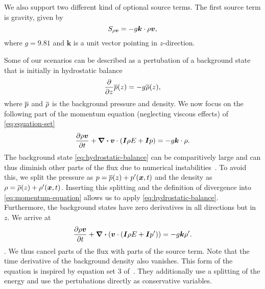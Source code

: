 We also support two different kind of optional source terms.
The first source term is gravity, given by
\begin{equation}\label{eq:source-gravity}
  \source[\Qj] = - g \bm{k} \cdot \Qj,
\end{equation}
where $g = 9.81$ and $\bm{k}$ is a unit vector pointing in $z$-direction.

\newcommand{\backgroundPressure}{\overline{\pressure}}
\newcommand{\backgroundRho}{\overline{\Qrho}}
Some of our scenarios can be described as a pertubation of a background state that is initially in hydrostatic balance
\begin{equation}
  \label{eq:hydrostatic-balance}
  \pdv{}{z} \backgroundPressure{\left (z \right )} = -g \backgroundRho(z),
\end{equation}
where $\backgroundPressure$ and $\backgroundRho$ is the background pressure and density.
We now focus on the following part of the momentum equation (neglecting viscous effects) of \cref{eq:equation-set}
\begin{equation}
  \label{eq:momentum-equation}
  \pdv{\Qj}{t}+ \divergence{
    \Qv \cdot \left( \bm{I} \QE + \bm{I} \pressure \right)
  }
  =
  -g \bm{k} \cdot \Qrho.
\end{equation}
The background state \cref{eq:hydrostatic-balance} can be comparitively large and can thus diminish other parts of the flux due to numerical instabilities~\cite{muller2010adaptive}.
To avoid this, we split the pressure as $\pressure = \backgroundPressure(z) + \pressure' (\bm{x}, t)$ and the density as $\Qrho = \backgroundRho(z) + \Qrho'(\bm{x}, t)$.
Inserting this splitting and the definition of divergence into \cref{eq:momentum-equation} allows us to apply \cref{eq:hydrostatic-balance}.
Furthermore, the background states have zero derivatives in all directions but in $z$.
We arrive at 
\begin{equation}
  \label{eq:momentum-equation-split}
  \pdv{\Qj}{t}+ \divergence \left(
    \Qv \cdot \left( \bm{I} \QE + \bm{I} \pressure' \right)
   \right)
  =
  -g \bm{k} \Qrho'.
\end{equation}.
We thus cancel parts of the flux with parts of the source term.
Note that the time derivative of the background density also vanishes.
This form of the equation is inspired by equation set 3 of~\cite{giraldo2008study}.
They additionally use a splitting of the energy and use the pertubations directly as conservative variables.

